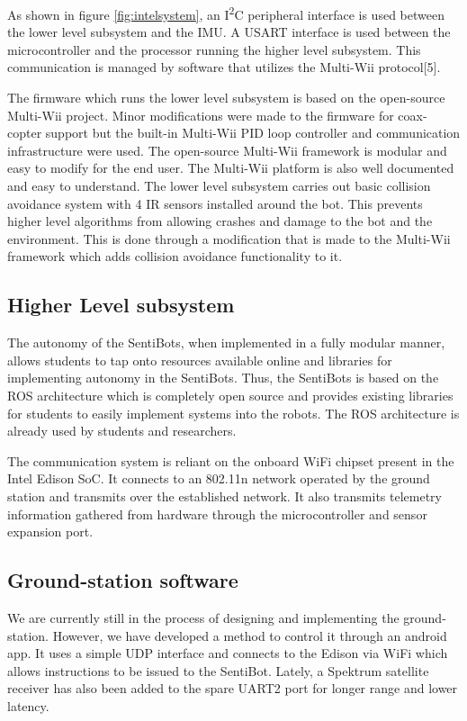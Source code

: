 \documentclass[12pt]{article}
\begin{document}
As shown in figure \ref{fig:intelsystem}, an I\textsuperscript{2}C peripheral interface is used between the lower level subsystem and the IMU. A USART interface is used between the microcontroller and the processor running the higher level subsystem. This communication is managed by software that utilizes the Multi-Wii protocol[5].

The firmware which runs the lower level subsystem is based on the open-source Multi-Wii project. Minor modifications were made to the firmware for coax-copter support but the built-in Multi-Wii PID loop controller and communication infrastructure were used. The open-source Multi-Wii framework is modular and easy to modify for the end user. The Multi-Wii platform is also well documented and easy to understand. The lower level subsystem carries out basic collision avoidance system with 4 IR sensors installed around the bot. This prevents higher level algorithms from allowing crashes and damage to the bot and the environment. This is done through a modification that is made to the Multi-Wii framework which adds collision avoidance functionality to it.

\subsection{Higher Level subsystem}

The autonomy of the SentiBots, when implemented in a fully modular manner, allows students to tap onto resources available online and libraries for implementing autonomy in the SentiBots. Thus, the SentiBots is based on the ROS architecture which is completely open source and provides existing libraries for students to easily implement systems into the robots. The ROS architecture is already used by students and researchers.

The communication system is reliant on the onboard WiFi chipset present in the Intel Edison SoC. It connects to an 802.11n network operated by the ground station and transmits over the established network. It also transmits telemetry information gathered from hardware through the microcontroller and sensor expansion port.

\subsection{Ground-station software}

We are currently still in the process of designing and implementing the ground-station. However, we have developed a method to control it through an android app. It uses a simple UDP interface and connects to the Edison via WiFi which allows instructions to be issued to the SentiBot. Lately, a Spektrum satellite receiver has also been added to the spare UART2 port for longer range and lower latency.
\end{document}
